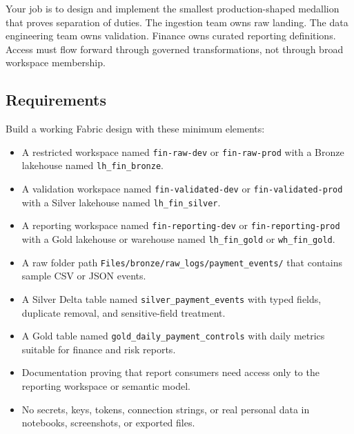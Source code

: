 Your job is to design and implement the smallest production-shaped medallion that proves separation of duties. The ingestion team owns raw landing. The data engineering team owns validation. Finance owns curated reporting definitions. Access must flow forward through governed transformations, not through broad workspace membership.

\subsection*{Requirements}
Build a working Fabric design with these minimum elements:
\begin{itemize}
    \item A restricted workspace named \texttt{fin-raw-dev} or \texttt{fin-raw-prod} with a Bronze lakehouse named \texttt{lh\_fin\_bronze}.
    \item A validation workspace named \texttt{fin-validated-dev} or \texttt{fin-validated-prod} with a Silver lakehouse named \texttt{lh\_fin\_silver}.
    \item A reporting workspace named \texttt{fin-reporting-dev} or \texttt{fin-reporting-prod} with a Gold lakehouse or warehouse named \texttt{lh\_fin\_gold} or \texttt{wh\_fin\_gold}.
    \item A raw folder path \texttt{Files/bronze/raw\_logs/payment\_events/} that contains sample CSV or JSON events.
    \item A Silver Delta table named \texttt{silver\_payment\_events} with typed fields, duplicate removal, and sensitive-field treatment.
    \item A Gold table named \texttt{gold\_daily\_payment\_controls} with daily metrics suitable for finance and risk reports.
    \item Documentation proving that report consumers need access only to the reporting workspace or semantic model.
    \item No secrets, keys, tokens, connection strings, or real personal data in notebooks, screenshots, or exported files.
\end{itemize}

